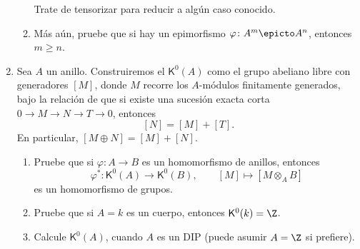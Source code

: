 \documentclass[11pt, reqno]{amsart}
\begin{document}
\begin{enumerate}
\begin{enumerate}
				\begin{hint}
					Trate de tensorizar para reducir a algún caso conocido.
				\end{hint}
			\item Más aún, pruebe que si hay un epimorfismo $\varphi \colon A^m \epicto A^n$, entonces $m
				\ge n$.
		\end{enumerate}

	\item Sea $A$ un anillo.
		Construiremos el  $\mathsf{K}^0(A)$ como el grupo abeliano libre con
		generadores $[M]$, donde $M$ recorre los $A$-módulos finitamente generados, bajo la relación de que si
		existe una sucesión exacta corta $0 \to M \to N \to T \to 0$, entonces
		\[
			[N] = [M] + [T].
		\]
		En particular, $[M\oplus N] = [M] + [N]$.
		\begin{enumerate}
			\item Pruebe que si $\varphi \colon A \to B$ es un homomorfismo de anillos, entonces
				\[
					\varphi^* \colon \mathsf{K}^0(A) \longrightarrow \mathsf{K}^0(B), \qquad
					[M] \longmapsto [M\otimes_A B]
				\]
				es un homomorfismo de grupos.
			\item Pruebe que si $A = k$ es un cuerpo, entonces $\mathsf{K}^0(k) = \Z$.
			\item\lookst
				Calcule $\mathsf{K}^0(A)$, cuando $A$ es un DIP (puede asumir $A = \Z$ si prefiere).

		\end{enumerate}
\end{enumerate}

\appendix
\end{document}

